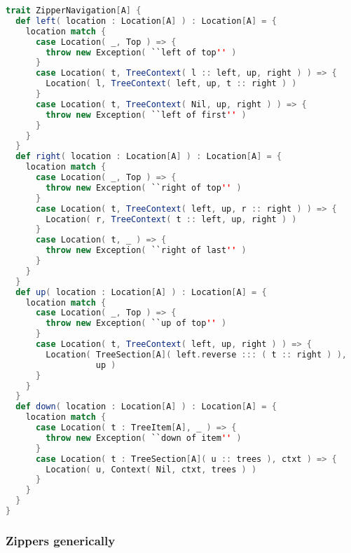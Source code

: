 \begin{lstlisting}[language=Scala,mathescape=true]
trait ZipperNavigation[A] {
  def left( location : Location[A] ) : Location[A] = {
    location match {
      case Location( _, Top ) => {
        throw new Exception( ``left of top'' )
      }
      case Location( t, TreeContext( l :: left, up, right ) ) => {
        Location( l, TreeContext( left, up, t :: right ) )
      }
      case Location( t, TreeContext( Nil, up, right ) ) => {
        throw new Exception( ``left of first'' )
      }
    }
  }
  def right( location : Location[A] ) : Location[A] = {
    location match {
      case Location( _, Top ) => {
        throw new Exception( ``right of top'' )
      }
      case Location( t, TreeContext( left, up, r :: right ) ) => {
        Location( r, TreeContext( t :: left, up, right ) )
      }
      case Location( t, _ ) => {
        throw new Exception( ``right of last'' )
      }
    }
  }
  def up( location : Location[A] ) : Location[A] = {
    location match {
      case Location( _, Top ) => {
        throw new Exception( ``up of top'' )
      }   
      case Location( t, TreeContext( left, up, right ) ) => {
        Location( TreeSection[A]( left.reverse ::: ( t :: right ) ),
                  up )
      }
    }
  }
  def down( location : Location[A] ) : Location[A] = {
    location match {
      case Location( t : TreeItem[A], _ ) => {
        throw new Exception( ``down of item'' )
      }
      case Location( t : TreeSection[A]( u :: trees ), ctxt ) => {
        Location( u, Context( Nil, ctxt, trees ) )
      }
    }
  }
}
\end{lstlisting}

\subsubsection{Zippers generically}

